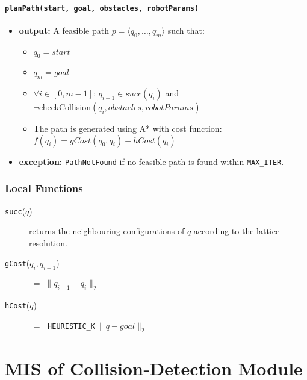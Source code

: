 \documentclass[12pt, titlepage]{article}
\begin{document}
\paragraph{\texttt{planPath(start, goal, obstacles, robotParams)}}
\begin{itemize}
  \item \textbf{output:} A feasible path $p = \langle q_0,\dots,q_m\rangle$ such that:
    \begin{itemize}
      \item $q_0 = start$
      \item $q_m = goal$
      \item $\forall i \in [0, m-1]$: $q_{i+1} \in succ(q_i)$ and \\ $\neg$checkCollision$(q_i,\textit{obstacles},\textit{robotParams})$
      \item The path is generated using A* with cost function: \\
        $f(q_i) = gCost(q_0, q_i) + hCost(q_i)$
    \end{itemize}
  \item \textbf{exception:} \texttt{PathNotFound} if no feasible path is found within \texttt{MAX\_ITER}.
\end{itemize}

\subsubsection{Local Functions}
\begin{description}
  \item[\texttt{succ}($q$)]  returns the neighbouring configurations of $q$ according to the lattice resolution.
  \item[\texttt{gCost}($q_i,q_{i+1}$)] $\;=\; \|q_{i+1}-q_i\|_2$
  \item[\texttt{hCost}($q$)] $\;=\;$ \texttt{HEURISTIC\_K}$\:\|q-\textit{goal}\|_2$
\end{description}

\newpage






\section{MIS of Collision‑Detection Module}
\label{mod:collision}
\end{document}
